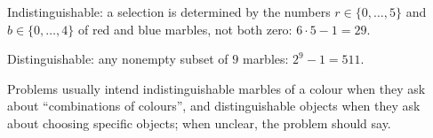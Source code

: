 Indistinguishable: a selection is determined by the numbers $r\in\{0,\dots,5\}$ and $b\in\{0,\dots,4\}$ of red and blue marbles, not both zero: $6\cdot5-1=\boxed{29}$.

Distinguishable: any nonempty subset of $9$ marbles: $2^9-1=\boxed{511}$.

Problems usually intend indistinguishable marbles of a colour when they ask about ``combinations of colours'', and distinguishable objects when they ask about choosing specific objects; when unclear, the problem should say.
